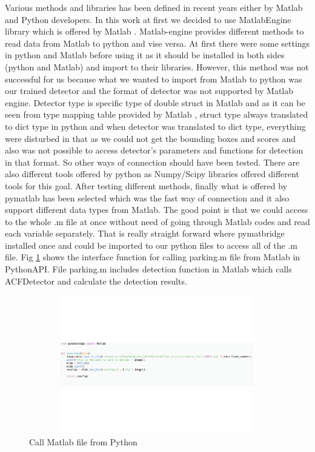 Various methods and libraries has been defined in recent years either by Matlab and Python developers. In this work at first we decided to use MatlabEngine library which is offered by Matlab \cite{matlabEngine}. Matlab-engine provides different methods to read data from Matlab to python and vise versa. At first there were some settings in python and Matlab before using it as it should be installed in both sides (python and Matlab) and import to their libraries. However, this method was not successful for us because what we wanted to import from Matlab to python was our trained detector and the format of detector was not supported by Matlab engine. Detector type is specific type of double struct in Matlab and as it can be seen from type mapping table provided by Matlab \cite{matlabEngineFormats}, struct type always translated to dict type in python and when detector was translated to dict type, everything were disturbed in that as we could not get the bounding boxes and scores and also was not possible to access detector's parameters and functions for detection in that format. So other ways of connection should have been tested. There are also different tools offered by python as Numpy/Scipy libraries offered different tools for this goal. After testing different methods, finally what is offered by pymatlab \cite{pypi} has been selected which was the fast way of connection and it also support different data types from Matlab. The good point is that we could access to the whole .m file at once without need of going through Matlab codes and read each variable separately. That is really straight forward where pymatbridge installed once and could be imported to our python files to access all of the .m file. Fig \ref{fig:interface} shows the interface function for calling parking.m file from Matlab in PythonAPI. File parking.m includes detection function in Matlab which calls ACFDetector and calculate the detection results.
\begin{figure}
\centering
    \includegraphics[width=12cm, height=6cm]{images/interface.pdf}
    \caption{Call Matlab file from Python}
    \label{fig:interface}
\end{figure}


